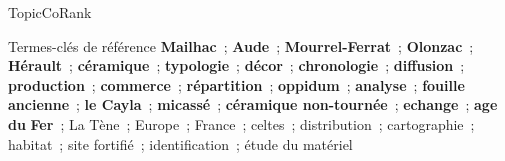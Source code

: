 \begin{frame}{TopicCoRank}
{\begin{exampleblock}
      \begin{exampleblock}{\small Termes-clés de référence}\justifying\small
        \textbf{Mailhac}~; \textbf{Aude}~; \textbf{Mourrel-Ferrat}~;
        \textbf{Olonzac}~; \textbf{Hérault}~; \textbf{céramique}~;
        \textbf{typologie}~; \textbf{décor}~; \textbf{chronologie}~;
        \textbf{diffusion}~; \textbf{production}~; \textbf{commerce}~;
        \textbf{répartition}~; \textbf{oppidum}~; \textbf{analyse}~;
        \textbf{fouille ancienne}~; \textbf{le Cayla}~;
        \textbf{micassé}~; \textbf{céramique non-tournée}~;
        \textbf{echange}~; \textbf{age du} \textbf{Fer}~; La Tène~;
        Europe~; France~; celtes~; distribution~; cartographie~; habitat~; site
        fortifié~; identification~; étude du matériel
      \end{exampleblock}
    \end{exampleblock}
  }
\end{frame}

